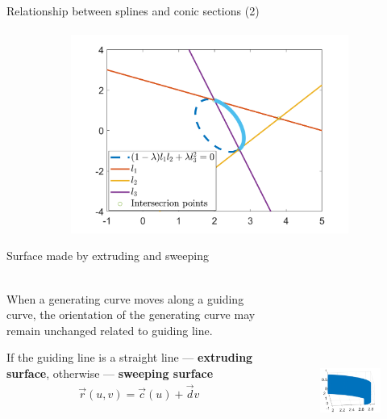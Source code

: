 \documentclass[aspectratio=169]{beamer}
\begin{document}
\begin{frame}[t]{Relationship between splines and conic sections (2)}
    \framesubtitle{}
    \vspace{-0.5cm}
        \begin{figure}[H]
            \centering\includegraphics[height=6.5cm,width=1\textwidth,keepaspectratio]{bezier_to_conic.png}
            \label{fig:bezier_to_conic.png}
        \end{figure}
    \end{frame}

\begin{frame}[t]{Surface made by extruding and sweeping}
\framesubtitle{}
    \begin{columns}[T,onlytextwidth]
        \begin{column}{0.49\textwidth}
            When a generating curve moves along a guiding curve, the orientation of the generating curve may remain unchanged related to guiding line. 
            
            If the guiding line is a straight line --- \textbf{extruding surface}, otherwise --- \textbf{sweeping surface}
            \begin{align*}
                \vec{r}(u,v) = \vec{c}(u) + \vec{d}v
            \end{align*}
        \end{column}
        \begin{column}{0.49\textwidth}
            \begin{figure}[H]
                \centering\includegraphics[height=6.5cm,width=1\textwidth,keepaspectratio]{extruding_surface.png}
                \label{fig:extruding_surface.png}
            \end{figure}
        \end{column}
    \end{columns}
\end{frame}
\end{document}
